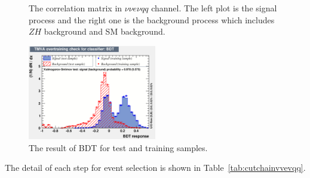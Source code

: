 \documentclass[11pt,a4paper]{cepcnote}
\begin{document}
\begin{figure}[H]
	\centering
	\caption[]{The correlation matrix in $\nu\nu e\nu qq$ channel. 
		The left plot is the signal process and the right one is the background process which includes $ZH$ background and 
		SM background.}
	\label{fig:nnHevqqtmvacm}
\end{figure}
\begin{figure}[H]
	\centering
	\includegraphics[width=0.5\textwidth]{nnH/lvqq/evqq/overtrain_BDT}
	\caption[]{The result of BDT for test and training samples.}
	\label{fig:nnHevqqbdt}
\end{figure}
The detail of each step for event selection is shown in Table~\ref{tab:cutchainvvevqq}.
\end{document}
